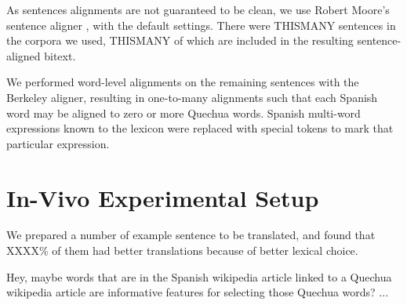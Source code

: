 \documentclass[10pt, a4paper]{article}
\begin{document}
As sentences alignments are not guaranteed to be clean, we use Robert Moore's
sentence aligner \cite{DBLP:conf/amta/Moore02}, with the default settings.
There were THISMANY sentences in the corpora we used, THISMANY of which are
included in the resulting sentence-aligned bitext.

We performed word-level alignments on the remaining sentences with the Berkeley
aligner, resulting in one-to-many alignments such that each Spanish word may be
aligned to zero or more Quechua words. Spanish multi-word expressions known to
the lexicon were replaced with special tokens to mark that particular
expression.


\section{In-Vivo Experimental Setup}
We prepared a number of example sentence to be translated, and found that
XXXX\% of them had better translations because of better lexical choice.


Hey, maybe words that are in the Spanish wikipedia article linked to a Quechua
wikipedia article are informative features for selecting those Quechua words?
...
\end{document}
